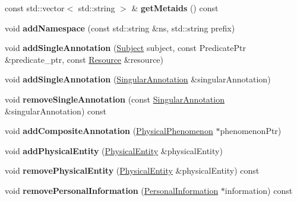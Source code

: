 \begin{DoxyCompactItemize}
const std\+::vector$<$ std\+::string $>$ \& {\bfseries get\+Metaids} () const
\item 
\mbox{\label{classomexmeta_1_1Editor_a052a725cee8b8e577c55e977eee81ace}} 
void {\bfseries add\+Namespace} (const std\+::string \&ns, std\+::string prefix)
\item 
\mbox{\label{classomexmeta_1_1Editor_a0417b55575a244817ef981f17c8e1a8f}} 
void {\bfseries add\+Single\+Annotation} (\hyperlink{classomexmeta_1_1Subject}{Subject} subject, const Predicate\+Ptr \&predicate\+\_\+ptr, const \hyperlink{classomexmeta_1_1Resource}{Resource} \&resource)
\item 
\mbox{\label{classomexmeta_1_1Editor_ae46835f3f35425d8087b80d08666aaa4}} 
void {\bfseries add\+Single\+Annotation} (\hyperlink{classomexmeta_1_1Triple}{Singular\+Annotation} \&singular\+Annotation)
\item 
\mbox{\label{classomexmeta_1_1Editor_afcb5ce7397aab23fabd3b4b4b89d3a54}} 
void {\bfseries remove\+Single\+Annotation} (const \hyperlink{classomexmeta_1_1Triple}{Singular\+Annotation} \&singular\+Annotation) const
\item 
\mbox{\label{classomexmeta_1_1Editor_a146ae84fb44991d9c6135e98f03fa972}} 
void {\bfseries add\+Composite\+Annotation} (\hyperlink{classomexmeta_1_1PhysicalPhenomenon}{Physical\+Phenomenon} $\ast$phenomenon\+Ptr)
\item 
\mbox{\label{classomexmeta_1_1Editor_a0740831baafe244374ad7a324d51a87e}} 
void {\bfseries add\+Physical\+Entity} (\hyperlink{classomexmeta_1_1PhysicalEntity}{Physical\+Entity} \&physical\+Entity)
\item 
\mbox{\label{classomexmeta_1_1Editor_a0acf94314252b70a4db89f83e6047e8f}} 
void {\bfseries remove\+Physical\+Entity} (\hyperlink{classomexmeta_1_1PhysicalEntity}{Physical\+Entity} \&physical\+Entity) const
\item 
\mbox{\label{classomexmeta_1_1Editor_a8be7fa01bef49ff1c93965781797c9bc}} 
void {\bfseries remove\+Personal\+Information} (\hyperlink{classomexmeta_1_1PersonalInformation}{Personal\+Information} $\ast$information) const

\end{DoxyCompactItemize}
